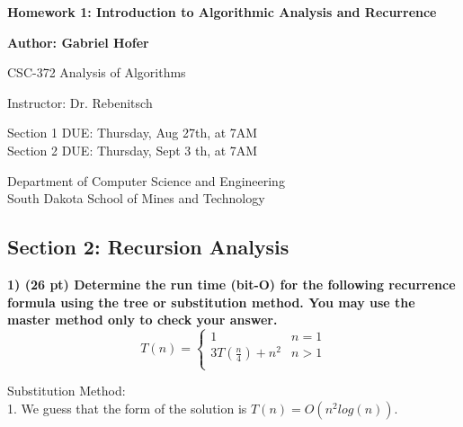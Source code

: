 \documentclass[12pt, a4paper]{article}
\begin{document}
\begin{titlepage}
   \begin{center}
       \vspace*{1cm}
       \large
       \textbf{Homework 1: Introduction to Algorithmic Analysis and Recurrence}
       \normalsize

       \vspace{0.5cm}

       \textbf{Author: Gabriel Hofer}

       \vspace{0.5cm}

       CSC-372 Analysis of Algorithms

       \vspace{0.5cm}

       Instructor: Dr. Rebenitsch

       \vspace{0.5cm}

       Section 1 DUE: Thursday, Aug 27th, at 7AM \\ 
       Section 2 DUE: Thursday, Sept 3 th, at 7AM  

       \vfill

       Department of Computer Science and Engineering\\
       South Dakota School of Mines and Technology\\

   \end{center}
\end{titlepage}
\newpage
\subsection*{Section 2: Recursion Analysis}

\textbf{1) (26 pt) Determine the run time (bit-O) for the following recurrence formula using the tree or substitution method.
You may use the master method only to check your answer. } \\ 

\[
  T(n) =  
  \begin{cases}
    1 & n = 1  \\
    3T(\frac{n}{4}) + n^2 & n > 1  \\
  \end{cases}
\]

Substitution Method: \\ 

1. We guess that the form of the solution is $ T(n) = O(n^2 log(n)) $.
\end{document}
